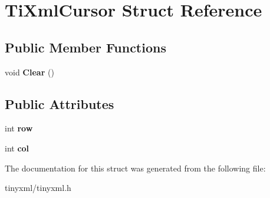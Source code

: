\hypertarget{struct_ti_xml_cursor}{\section{\-Ti\-Xml\-Cursor \-Struct \-Reference}
\label{struct_ti_xml_cursor}
}
\subsection*{\-Public \-Member \-Functions}
\begin{DoxyCompactItemize}
\item 
\hypertarget{struct_ti_xml_cursor_a1e6fa622b59dafb71b6efe595105dcdd}{void {\bfseries \-Clear} ()}\label{struct_ti_xml_cursor_a1e6fa622b59dafb71b6efe595105dcdd}

\end{DoxyCompactItemize}
\subsection*{\-Public \-Attributes}
\begin{DoxyCompactItemize}
\item 
\hypertarget{struct_ti_xml_cursor_a5b54dd949820c2db061e2be41f3effb3}{int {\bfseries row}}\label{struct_ti_xml_cursor_a5b54dd949820c2db061e2be41f3effb3}

\item 
\hypertarget{struct_ti_xml_cursor_a5694d7ed2c4d20109d350c14c417969d}{int {\bfseries col}}\label{struct_ti_xml_cursor_a5694d7ed2c4d20109d350c14c417969d}

\end{DoxyCompactItemize}


\-The documentation for this struct was generated from the following file\-:\begin{DoxyCompactItemize}
\item 
tinyxml/tinyxml.\-h\end{DoxyCompactItemize}
